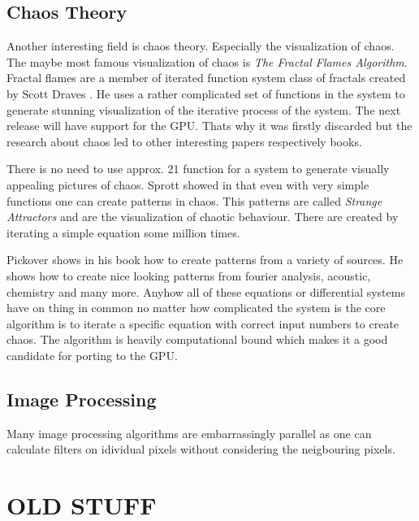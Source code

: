 \subsection{Chaos Theory} %
\label{par:chaos_theory}
Another interesting field is chaos theory. Especially the visualization of
chaos. The maybe most famous visualization of chaos is \emph{The Fractal Flames
Algorithm}. Fractal flames are a member of iterated function system class of
fractals created by Scott Draves \citep{citeulike:3801950}. He uses a rather
complicated set of functions in the system to generate stunning visualization of
the iterative process of the system. The next release will have support for the
GPU. Thats why it was firstly discarded but the research about chaos led to
other interesting papers respectively books.

There is no need to use approx. 21 function for a system to generate visually
appealing pictures of chaos. Sprott showed in \citep{citeulike:3745535} that even
with very simple functions one can create patterns in chaos. This patterns are
called \emph{Strange Attractors} and are the visualization of chaotic behaviour.
There are created by iterating a simple equation some million times. 

Pickover shows in his book \citep{citeulike:3812233} how to create patterns from
a variety of sources. He shows how to create nice looking patterns from fourier
analysis, acoustic, chemistry and many more. Anyhow all of these equations or
differential systems have on thing in common no matter how complicated the
system is the core algorithm is to iterate a specific equation with correct
input numbers to create chaos. The algorithm is heavily computational bound
which makes it a good candidate for porting to the GPU.


\subsection{Image Processing}
Many image processing algorithms are embarrassingly parallel as one can calculate
filters on idividual pixels without considering the neigbouring pixels. 


\section{OLD STUFF}


